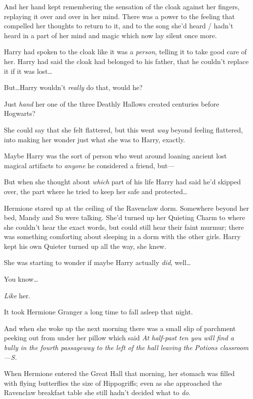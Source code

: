 And her hand kept remembering the sensation of the cloak against her fingers, replaying it over and over in her mind. There was a power to the feeling that compelled her thoughts to return to it, and to the song she’d heard / hadn’t heard in a part of her mind and magic which now lay silent once more.

Harry had spoken to the cloak like it was a \emph{person}, telling it to take good care of her. Harry had said the cloak had belonged to his father, that he couldn’t replace it if it was lost…

But…Harry wouldn’t \emph{really} do that, would he?

Just \emph{hand} her one of the three Deathly Hallows created centuries before Hogwarts?

She could say that she felt flattered, but this went \emph{way} beyond feeling flattered, into making her wonder just what she was to Harry, exactly.

Maybe Harry was the sort of person who went around loaning ancient lost magical artifacts to \emph{anyone} he considered a friend, but—

But when she thought about \emph{which} part of his life Harry had said he’d skipped over, the part where he tried to keep her safe and protected…

Hermione stared up at the ceiling of the Ravenclaw dorm. Somewhere beyond her bed, Mandy and Su were talking. She’d turned up her Quieting Charm to where she couldn’t hear the exact words, but could still hear their faint murmur; there was something comforting about sleeping in a dorm with the other girls. Harry kept his own Quieter turned up all the way, she knew.

She was starting to wonder if maybe Harry actually \emph{did}, well…

You know…

\emph{Like} her.

It took Hermione Granger a long time to fall asleep that night.

And when she woke up the next morning there was a small slip of parchment peeking out from under her pillow which said \emph{At half-past ten you will find a bully in the fourth passageway to the left of the hall leaving the Potions classroom—S.}

\later

When Hermione entered the Great Hall that morning, her stomach was filled with flying butterflies the size of Hippogriffs; even as she approached the Ravenclaw breakfast table she still hadn’t decided what to \emph{do}.

